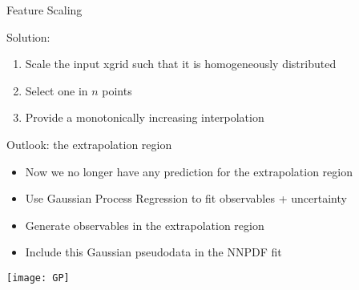 \begin{frame}{Feature Scaling}

\vspace*{\titleskip}

Solution:
\begin{enumerate}
\item<1-|alert@1-3> Scale the input xgrid such that it is homogeneously distributed
\item<1-|alert@4> Select one in $n$ points  
\item<1-|alert@5> Provide a monotonically increasing interpolation
\end{enumerate}


\begin{center}
\end{center}

\end{frame}



\begin{frame}{Outlook: the extrapolation region}

\vspace*{\titleskip}

\begin{itemize}
\item Now we no longer have any prediction for the extrapolation region
\item Use Gaussian Process Regression to fit observables + uncertainty
\item Generate observables in the extrapolation region
\item Include this Gaussian pseudodata in the NNPDF fit
\end{itemize}

\vspace*{\secondskip}


\begin{center}
\texttt{[image: GP]}
\end{center}


\end{frame}

